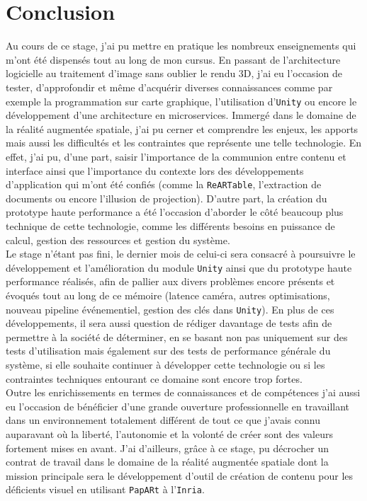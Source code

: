 \chapter{Conclusion}

Au cours de ce stage, j'ai pu mettre en pratique les nombreux enseignements qui m'ont été dispensés tout au long de mon cursus. En passant de l'architecture logicielle au traitement d'image sans oublier le rendu 3D, j'ai eu l'occasion de tester, d'approfondir et même d'acquérir diverses connaissances comme par exemple la programmation sur carte graphique, l'utilisation d'\texttt{Unity} ou encore le développement d'une architecture en microservices. Immergé dans le domaine de la réalité augmentée spatiale, j'ai pu cerner et comprendre les enjeux, les apports mais aussi les difficultés et les contraintes que représente une telle technologie. En effet, j'ai pu, d'une part, saisir l'importance de la communion entre contenu et interface ainsi que l'importance du contexte lors des développements d'application qui m'ont été confiés (comme la \texttt{ReARTable}, l'extraction de documents ou encore l'illusion de projection). D'autre part, la création du prototype haute performance a été l'occasion d'aborder le côté beaucoup plus technique de cette technologie, comme les différents besoins en puissance de calcul, gestion des ressources et gestion du système.\\

Le stage n'étant pas fini, le dernier mois de celui-ci sera consacré à poursuivre le développement et l'amélioration du module \texttt{Unity} ainsi que du prototype haute performance réalisés, afin de pallier aux divers problèmes encore présents et évoqués tout au long de ce mémoire (latence caméra, autres optimisations, nouveau pipeline événementiel, gestion des clés dans \texttt{Unity}). En plus de ces développements, il sera aussi question de rédiger davantage de tests afin de permettre à la société de déterminer, en se basant non pas uniquement sur des tests d'utilisation mais également sur des tests de performance générale du système, si elle souhaite continuer à développer cette technologie ou si les contraintes techniques entourant ce domaine sont encore trop fortes.\\

Outre les enrichissements en termes de connaissances et de compétences j'ai aussi eu l'occasion de bénéficier d'une grande ouverture professionnelle en travaillant dans un environnement totalement différent de tout ce que j'avais connu auparavant où la liberté, l'autonomie et la volonté de créer sont des valeurs fortement mises en avant.
J'ai d'ailleurs, grâce à ce stage, pu décrocher un contrat de travail dans le domaine de la réalité augmentée spatiale dont la mission principale sera le développement d'outil de création de contenu pour les déficients visuel en utilisant \texttt{PapARt} à l'\texttt{Inria}.